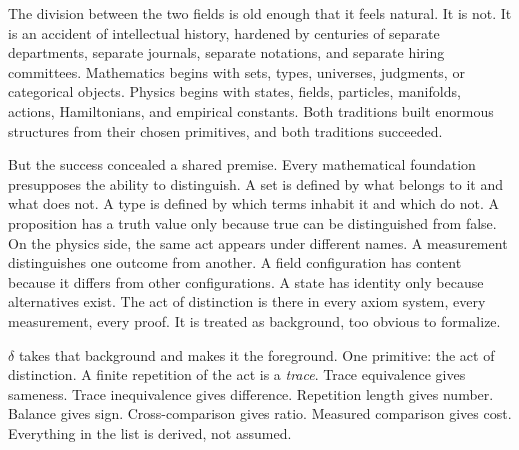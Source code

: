\documentclass[11pt,a4paper]{article}
\theoremstyle{definition}
\theoremstyle{remark}
\begin{document}
The division between the two fields is old enough that it feels natural. It
is not. It is an accident of intellectual history, hardened by centuries of
separate departments, separate journals, separate notations, and separate
hiring committees. Mathematics begins with sets, types, universes, judgments,
or categorical objects. Physics begins with states, fields, particles,
manifolds, actions, Hamiltonians, and empirical constants. Both traditions
built enormous structures from their chosen primitives, and both traditions
succeeded.

But the success concealed a shared premise. Every mathematical foundation
presupposes the ability to distinguish. A set is defined by what belongs to it
and what does not. A type is defined by which terms inhabit it and which do
not. A proposition has a truth value only because true can be distinguished
from false. On the physics side, the same act appears under different names. A
measurement distinguishes one outcome from another. A field configuration has
content because it differs from other configurations. A state has identity only
because alternatives exist. The act of distinction is there in every axiom
system, every measurement, every proof. It is treated as background, too
obvious to formalize.

$\delta$ takes that background and makes it the foreground. One primitive: the
act of distinction. A finite repetition of the act is a \emph{trace}. Trace
equivalence gives sameness. Trace inequivalence gives difference. Repetition
length gives number. Balance gives sign. Cross-comparison gives ratio. Measured
comparison gives cost. Everything in the list is derived, not assumed.
\end{document}

